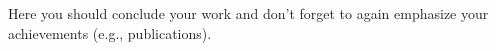 \documentclass[a4paper,12pt,oneside]{book}
\begin{document}
Here you should conclude your work and don't forget to again emphasize your achievements (e.g., publications). 






\clearpage



\clearpage
\end{document}

